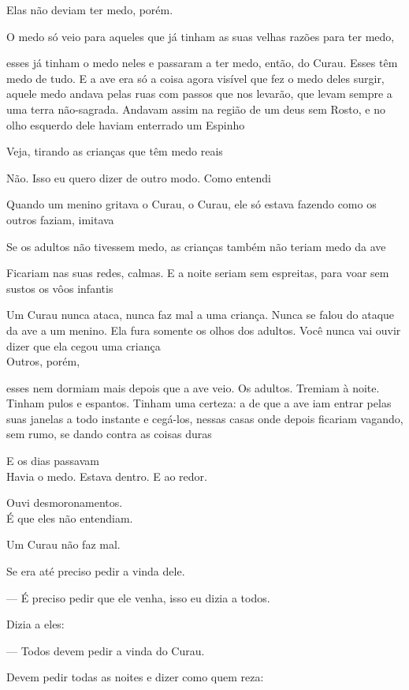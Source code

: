 Elas não deviam ter medo, porém.

O medo só veio para aqueles que já tinham as suas velhas razões para ter
medo,

esses já tinham o medo neles e passaram a ter medo, então, do Curau.
Esses têm medo de tudo. E a ave era só a coisa agora visível que fez o
medo deles surgir, aquele medo andava pelas ruas com passos que nos
levarão, que levam sempre a uma terra não-sagrada. Andavam assim na
região de um deus sem Rosto, e no olho esquerdo dele haviam enterrado um
Espinho

Veja, tirando as crianças que têm medo reais

Não. Isso eu quero dizer de outro modo. Como entendi

Quando um menino gritava o Curau, o Curau, ele só estava fazendo como os
outros faziam, imitava

Se os adultos não tivessem medo, as crianças também não teriam medo da
ave

Ficariam nas suas redes, calmas. E a noite seriam sem espreitas, para
voar sem sustos os vôos infantis

Um Curau nunca ataca, nunca faz mal a uma criança. Nunca se falou do
ataque da ave a um menino. Ela fura somente os olhos dos adultos. Você
nunca vai ouvir dizer que ela cegou uma criança\\

Outros, porém,

esses nem dormiam mais depois que a ave veio. Os adultos. Tremiam à
noite. Tinham pulos e espantos. Tinham uma certeza: a de que a ave iam
entrar pelas suas janelas a todo instante e cegá-los, nessas casas onde
depois ficariam vagando, sem rumo, se dando contra as coisas duras

E os dias passavam\\

Havia o medo. Estava dentro. E ao redor.

Ouvi desmoronamentos.\\

É que eles não entendiam.

Um Curau não faz mal.

Se era até preciso pedir a vinda dele.

--- É preciso pedir que ele venha, isso eu dizia a todos.

Dizia a eles:

--- Todos devem pedir a vinda do Curau.

Devem pedir todas as noites e dizer como quem reza:

